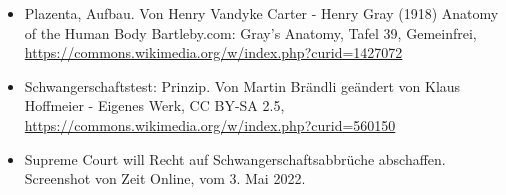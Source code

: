 \documentclass{beamer}
\begin{document}
\begin{frame}
\begin{tiny}
\begin{itemize}
\item
Plazenta, Aufbau. Von Henry Vandyke Carter - Henry Gray (1918) Anatomy of the Human Body Bartleby.com: Gray's Anatomy, Tafel 39, Gemeinfrei, \url{https://commons.wikimedia.org/w/index.php?curid=1427072 }

\item
Schwangerschaftstest: Prinzip. Von Martin Brändli geändert von Klaus Hoffmeier - Eigenes Werk, CC BY-SA 2.5, \url{https://commons.wikimedia.org/w/index.php?curid=560150}




\item
Supreme Court will Recht auf Schwangerschaftsabbrüche abschaffen. Screenshot von Zeit Online, vom 3. Mai 2022.
\end{itemize}
\end{tiny}
\end{frame}
\end{document}
